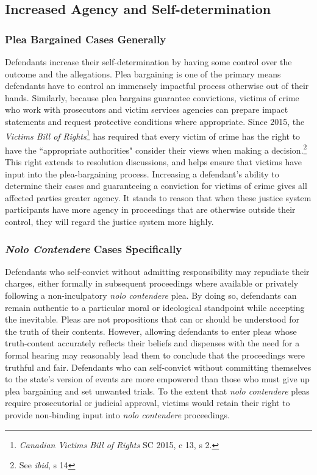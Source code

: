 \subsection{Increased Agency and Self-determination}

\subsubsection{Plea Bargained Cases Generally}

Defendants increase their self-determination by having some control over the outcome and the allegations. Plea bargaining is one of the primary means defendants have to control an immensely impactful process otherwise out of their hands. Similarly, because plea bargains guarantee convictions, victims of crime who work with prosecutors and victim services agencies can prepare impact statements and request protective conditions where appropriate. Since 2015, the \textit{Victims Bill of Rights}\footnote{\textit{Canadian Victims Bill of Rights} SC 2015, c 13, s 2.} has required that every victim of crime has the right to have the ``appropriate authorities" consider their views when making a decision.\footnote{See \textit{ibid}, s 14} This right extends to resolution discussions, and helps ensure that victims have input into the plea-bargaining process. Increasing a defendant's ability to determine their cases and guaranteeing a conviction for victims of crime gives all affected parties greater agency. It stands to reason that when these justice system participants have more agency in proceedings that are otherwise outside their control, they will regard the justice system more highly.

\subsubsection{\textit{Nolo Contendere} Cases Specifically}

Defendants who self-convict without admitting responsibility may repudiate their charges, either formally in subsequent proceedings where available or privately following a non-inculpatory \textit{nolo contendere} plea. By doing so, defendants can remain authentic to a particular moral or ideological standpoint while accepting the inevitable. Pleas are not propositions that can or should be understood for the truth of their contents. However, allowing defendants to enter pleas whose truth-content accurately reflects their beliefs and dispenses with the need for a formal hearing may reasonably lead them to conclude that the proceedings were truthful and fair. Defendants who can self-convict without committing themselves to the state's version of events are more empowered than those who must give up plea bargaining and set unwanted trials. To the extent that \textit{nolo contendere} pleas require prosecutorial or judicial approval, victims would retain their right to provide non-binding input into \textit{nolo contendere} proceedings.

